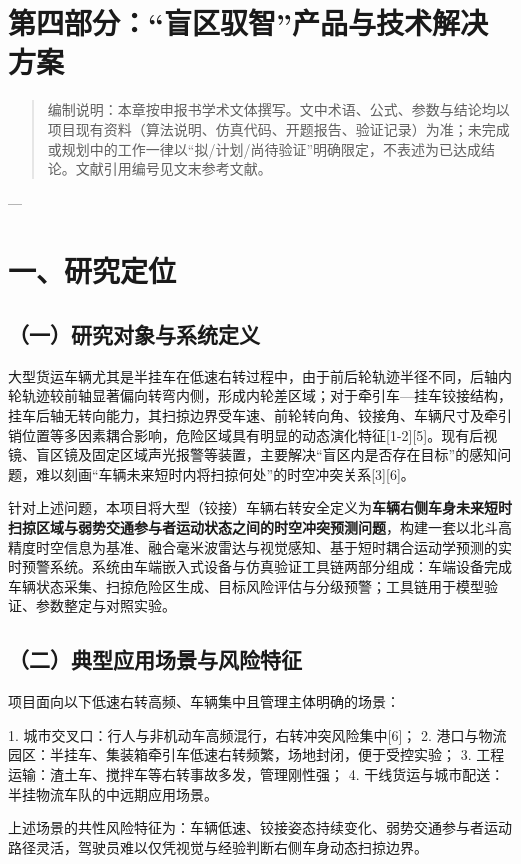 \documentclass[UTF8,11pt]{ctexart}
\begin{document}
\section*{\Large 第四部分：“盲区驭智”产品与技术解决方案}
\begin{quote}\small
编制说明：本章按申报书学术文体撰写。文中术语、公式、参数与结论均以项目现有资料（算法说明、仿真代码、开题报告、验证记录）为准；未完成或规划中的工作一律以“拟/计划/尚待验证”明确限定，不表述为已达成结论。文献引用编号见文末参考文献。
\end{quote}
---

\section*{一、研究定位}
\subsection*{（一）研究对象与系统定义}
大型货运车辆尤其是半挂车在低速右转过程中，由于前后轮轨迹半径不同，后轴内轮轨迹较前轴显著偏向转弯内侧，形成内轮差区域；对于牵引车—挂车铰接结构，挂车后轴无转向能力，其扫掠边界受车速、前轮转向角、铰接角、车辆尺寸及牵引销位置等多因素耦合影响，危险区域具有明显的动态演化特征[1-2][5]。现有后视镜、盲区镜及固定区域声光报警等装置，主要解决“盲区内是否存在目标”的感知问题，难以刻画“车辆未来短时内将扫掠何处”的时空冲突关系[3][6]。

针对上述问题，本项目将大型（铰接）车辆右转安全定义为\textbf{车辆右侧车身未来短时扫掠区域与弱势交通参与者运动状态之间的时空冲突预测问题}，构建一套以北斗高精度时空信息为基准、融合毫米波雷达与视觉感知、基于短时耦合运动学预测的实时预警系统。系统由车端嵌入式设备与仿真验证工具链两部分组成：车端设备完成车辆状态采集、扫掠危险区生成、目标风险评估与分级预警；工具链用于模型验证、参数整定与对照实验。

\subsection*{（二）典型应用场景与风险特征}
项目面向以下低速右转高频、车辆集中且管理主体明确的场景：

1. 城市交叉口：行人与非机动车高频混行，右转冲突风险集中[6]； 2. 港口与物流园区：半挂车、集装箱牵引车低速右转频繁，场地封闭，便于受控实验； 3. 工程运输：渣土车、搅拌车等右转事故多发，管理刚性强； 4. 干线货运与城市配送：半挂物流车队的中远期应用场景。

上述场景的共性风险特征为：车辆低速、铰接姿态持续变化、弱势交通参与者运动路径灵活，驾驶员难以仅凭视觉与经验判断右侧车身动态扫掠边界。
\end{document}
